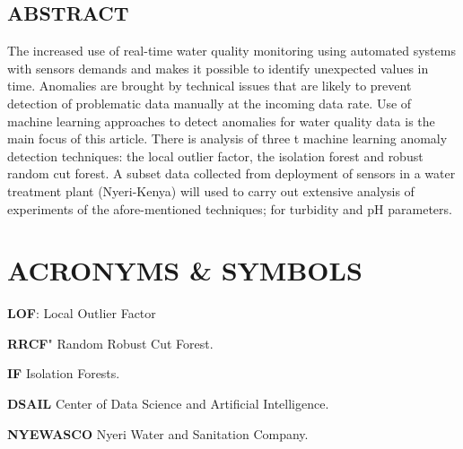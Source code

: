 \documentclass[12pt]{report}
\begin{document}
\subsection*{\centering ABSTRACT}
\par
The increased use of real-time water quality monitoring using
automated systems with sensors demands and makes it
possible to identify unexpected values in time. Anomalies are
brought by technical issues that are likely to prevent detection
of problematic data manually at the incoming data rate. Use of
machine learning approaches to detect anomalies for water
quality data is the main focus of this article. There is analysis
of three t machine learning anomaly detection
techniques: the local outlier factor, the isolation forest and robust random cut forest. A subset data collected from deployment of sensors in a water
treatment plant (Nyeri-Kenya) will used to carry out extensive
analysis of experiments of the afore-mentioned techniques;
for turbidity and pH parameters.
\clearpage

\tableofcontents
{}
\clearpage
\section*{ACRONYMS \& SYMBOLS}
    \item \textbf{LOF}: Local Outlier  Factor
    \item  \textbf{RRCF}" Random Robust  Cut  Forest. 
    \item \textbf{IF} Isolation Forests.
    \item \textbf{DSAIL} Center  of  Data Science  and  Artificial Intelligence. 
    \item  \textbf{NYEWASCO}  Nyeri Water
and Sanitation Company. 
\clearpage



\end{document}
